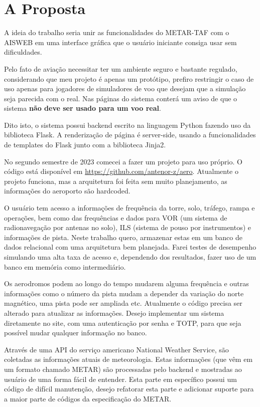 \chapter{A Proposta}
A ideia do trabalho seria unir as funcionalidades do METAR-TAF com o AISWEB
em uma interface gráfica que o usuário iniciante consiga usar sem dificuldades.

Pelo fato de aviação necessitar ter um ambiente seguro e bastante regulado, considerando
que meu projeto é apenas um protótipo, prefiro restringir o caso de uso apenas
para jogadores de simuladores de voo que desejam que a simulação seja parecida
com o real. Nas páginas do sistema conterá um aviso de que o sistema \textbf{não
deve ser usado para um voo real}.

Dito isto, o sistema possui backend escrito na linguagem Python fazendo uso
da biblioteca Flask. A renderização de página é server-side, usando a funcionalidades
de templates do Flask junto com a biblioteca Jinja2.

No segundo semestre de 2023 comecei a fazer um projeto para uso próprio.
O código está disponível em \url{https://github.com/antenor-z/aero}. Atualmente o
projeto funciona, mas a arquitetura foi feita sem muito planejamento, as
informações do aeroporto são hardcoded.

O usuário tem acesso a informações de frequência da torre, solo, tráfego, rampa
e operações, bem como das frequências e dados para VOR (um sistema de radionavegação
por antenas no solo), ILS (sistema de pouso por instrumentos) e informações
de pista. Neste trabalho quero, armazenar estas
em um banco de dados relacional com uma arquitetura bem planejada. Farei testes
de desempenho simulando uma alta taxa de acesso e, dependendo dos resultados,
fazer uso de um banco em memória como intermediário. 

Os aerodromos podem ao longo do tempo mudarem alguma frequência e outras
informações como o número da pista mudam a depender da variação do norte magnético,
uma pista pode ser ampliada etc.
Atualmente o código precisa ser alterado para atualizar as informações.
Desejo implementar um sistema diretamente no site, com uma autenticação por
senha e TOTP, para que seja possível mudar qualquer informação no banco.

Através de uma API do serviço americano National Weather Service, são coletadas 
as informações atuais de meteorologia. Estas informações (que vêm em um formato
chamado METAR) são processadas pelo backend e mostradas ao usuário de uma forma 
fácil de entender. Esta parte em específico possui um código de difícil manutenção,
desejo refatorar esta parte e adicionar suporte para a maior parte de códigos
da especificação do METAR.
